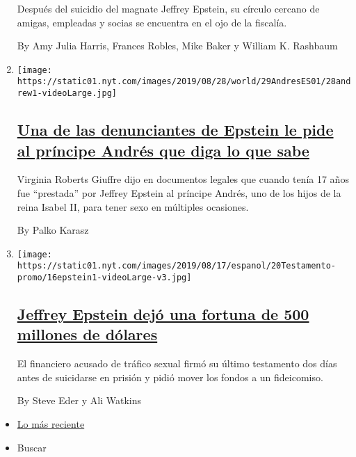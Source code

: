 \begin{enumerate}
  Después del suicidio del magnate Jeffrey Epstein, su círculo cercano
  de amigas, empleadas y socias se encuentra en el ojo de la fiscalía.

  By Amy Julia Harris, Frances Robles, Mike Baker y William K. Rashbaum
\item
  \texttt{[image: https://static01.nyt.com/images/2019/08/28/world/29AndresES01/28andrew1-videoLarge.jpg]}

  \hypertarget{una-de-las-denunciantes-de-epstein-le-pide-al-pruxedncipe-andruxe9s-que-diga-lo-que-sabe}{%
  \subsection{\texorpdfstring{\href{/es/2019/08/28/espanol/mundo/jeffrey-epstein-principe-andres.html}{Una
  de las denunciantes de Epstein le pide al príncipe Andrés que diga lo
  que
  sabe}}{Una de las denunciantes de Epstein le pide al príncipe Andrés que diga lo que sabe}}\label{una-de-las-denunciantes-de-epstein-le-pide-al-pruxedncipe-andruxe9s-que-diga-lo-que-sabe}}

  Virginia Roberts Giuffre dijo en documentos legales que cuando tenía
  17 años fue ``prestada'' por Jeffrey Epstein al príncipe Andrés, uno
  de los hijos de la reina Isabel II, para tener sexo en múltiples
  ocasiones.

  By Palko Karasz
\item
  \texttt{[image: https://static01.nyt.com/images/2019/08/17/espanol/20Testamento-promo/16epstein1-videoLarge-v3.jpg]}

  \hypertarget{jeffrey-epstein-dejuxf3-una-fortuna-de-500-millones-de-duxf3lares}{%
  \subsection{\texorpdfstring{\href{/es/2019/08/20/espanol/mundo/jeffrey-epstein-dinero-testamento.html}{Jeffrey
  Epstein dejó una fortuna de 500 millones de
  dólares}}{Jeffrey Epstein dejó una fortuna de 500 millones de dólares}}\label{jeffrey-epstein-dejuxf3-una-fortuna-de-500-millones-de-duxf3lares}}

  El financiero acusado de tráfico sexual firmó su último testamento dos
  días antes de suicidarse en prisión y pidió mover los fondos a un
  fideicomiso.

  By Steve Eder y Ali Watkins
\end{enumerate}

\begin{itemize}
\tightlist
\item
  \protect\hyperlink{stream-panel}{Lo más reciente}
\item
  Buscar
\end{itemize}


